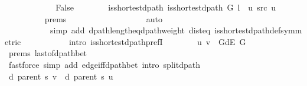 \begin{isabellebody}
\ \ \ \ \isamarkupfalse%
\isanewline
\ \ \ \ \ \ \isamarkupfalse%
\ False\isanewline
\ \ \ \ \ \ \isamarkupfalse%
\ is{\isacharunderscore}{\kern0pt}shortest{\isacharunderscore}{\kern0pt}dpath{\isacharcolon}{\kern0pt}\ {\isachardoublequoteopen}is{\isacharunderscore}{\kern0pt}shortest{\isacharunderscore}{\kern0pt}dpath\ G\ {\isacharparenleft}{\kern0pt}l\ {\isacharat}{\kern0pt}\ {\isacharbrackleft}{\kern0pt}u{\isacharbrackright}{\kern0pt}{\isacharparenright}{\kern0pt}\ src\ u{\isachardoublequoteclose}\isanewline
\ \ \ \ \ \ \ \ \isamarkupfalse%
\ {\isachardoublequoteopen}{}{\isachardot}{\kern0pt}prems{\isachardoublequoteclose}{\isacharparenleft}{\kern0pt}{}{\isacharparenright}{\kern0pt}\isanewline
\ \ \ \ \ \ \ \ \isamarkupfalse%
\isanewline
\ \ \ \ \ \ \ \ \ \ {\isacharparenleft}{\kern0pt}auto\isanewline
\ \ \ \ \ \ \ \ \ \ \ simp\ add{\isacharcolon}{\kern0pt}\ dpath{\isacharunderscore}{\kern0pt}length{\isacharunderscore}{\kern0pt}eq{\isacharunderscore}{\kern0pt}dpath{\isacharunderscore}{\kern0pt}weight\ dist{\isacharunderscore}{\kern0pt}eq{\isacharunderscore}{\kern0pt}{\isasymdelta}\ is{\isacharunderscore}{\kern0pt}shortest{\isacharunderscore}{\kern0pt}dpath{\isacharunderscore}{\kern0pt}def{\isacharbrackleft}{\kern0pt}symmetric{\isacharbrackright}{\kern0pt}\isanewline
\ \ \ \ \ \ \ \ \ \ \ intro{\isacharcolon}{\kern0pt}\ is{\isacharunderscore}{\kern0pt}shortest{\isacharunderscore}{\kern0pt}dpath{\isacharunderscore}{\kern0pt}prefI{\isacharparenright}{\kern0pt}\isanewline
\ \ \ \ \ \ \isamarkupfalse%
\ {\isachardoublequoteopen}{\isacharparenleft}{\kern0pt}u{\isacharcomma}{\kern0pt}\ v{\isacharparenright}{\kern0pt}\ {\isasymin}\ G{\isachardot}{\kern0pt}dE\ G{\isachardoublequoteclose}\isanewline
\ \ \ \ \ \ \ \ \isamarkupfalse%
\ {\isachardoublequoteopen}{}{\isachardot}{\kern0pt}prems{\isachardoublequoteclose}{\isacharparenleft}{\kern0pt}{}{\isacharparenright}{\kern0pt}\ last{\isacharunderscore}{\kern0pt}of{\isacharunderscore}{\kern0pt}dpath{\isacharunderscore}{\kern0pt}bet\isanewline
\ \ \ \ \ \ \ \ \isamarkupfalse%
\ {\isacharparenleft}{\kern0pt}fastforce\ simp\ add{\isacharcolon}{\kern0pt}\ edge{\isacharunderscore}{\kern0pt}iff{\isacharunderscore}{\kern0pt}dpath{\isacharunderscore}{\kern0pt}bet\ intro{\isacharcolon}{\kern0pt}\ split{\isacharunderscore}{\kern0pt}dpath{\isacharparenright}{\kern0pt}\isanewline
\ \ \ \ \ \ \isamarkupfalse%
\ {\isachardoublequoteopen}d\ {\isacharparenleft}{\kern0pt}parent\ s{\isacharparenright}{\kern0pt}\ v\ {\isasymle}\ d\ {\isacharparenleft}{\kern0pt}parent\ s{\isacharparenright}{\kern0pt}\ u\ {\isacharplus}{\kern0pt}\ {}{\isachardoublequoteclose}\isanewline

\end{isabellebody}
